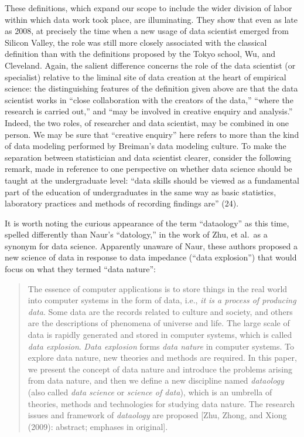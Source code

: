 \documentclass[
  letterpaper,
]{report}
\begin{document}
These definitions, which expand our scope to include the wider division
of labor within which data work took place, are illuminating. They show
that even as late as 2008, at precisely the time when a new usage of
data scientist emerged from Silicon Valley, the role was still more
closely associated with the classical definition than with the
definitions proposed by the Tokyo school, Wu, and Cleveland. Again, the
salient difference concerns the role of the data scientist (or
specialist) relative to the liminal site of data creation at the heart
of empirical science: the distinguishing features of the definition
given above are that the data scientist works in ``close collaboration
with the creators of the data,'' ``where the research is carried out,''
and ``may be involved in creative enquiry and analysis.'' Indeed, the
two roles, of researcher and data scientist, may be combined in one
person. We may be sure that ``creative enquiry'' here refers to more
than the kind of data modeling performed by Breiman's data modeling
culture. To make the separation between statistician and data scientist
clearer, consider the following remark, made in reference to one
perspective on whether data science should be taught at the
undergraduate level: ``data skills should be viewed as a fundamental
part of the education of undergraduates in the same way as basic
statistics, laboratory practices and methods of recording findings are''
(24).

It is worth noting the curious appearance of the term ``dataology'' as
this time, spelled differently than Naur's ``datology,'' in the work of
Zhu, et al.~as a synonym for data science. Apparently unaware of Naur,
these authors proposed a new science of data in response to data
impedance (``data explosion'') that would focus on what they termed
``data nature'':

\begin{quote}
The essence of computer applications is to store things in the real
world into computer systems in the form of data, i.e., \emph{it is a
process of producing data}. Some data are the records related to culture
and society, and others are the descriptions of phenomena of universe
and life. The large scale of data is rapidly generated and stored in
computer systems, which is called \emph{data explosion}. \emph{Data
explosion} forms \emph{data nature} in computer systems. To explore data
nature, new theories and methods are required. In this paper, we present
the concept of data nature and introduce the problems arising from data
nature, and then we define a new discipline named \emph{dataology} (also
called \emph{data science} or \emph{science of data}), which is an
umbrella of theories, methods and technologies for studying data nature.
The research issues and framework of \emph{dataology} are proposed
{[}Zhu, Zhong, and Xiong (2009): abstract; emphases in original{]}.
\end{quote}
\end{document}
